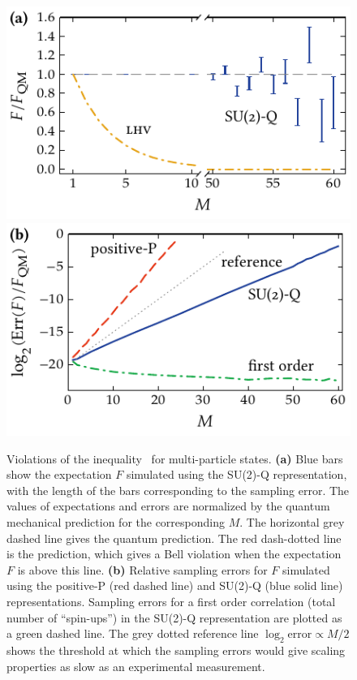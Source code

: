 \begin{figure}
    \centerline{%
    \includegraphics{figures_generated/bell/ghz_violations.pdf}%
    \includegraphics{figures_generated/bell/ghz_errors.pdf}}

    \caption[Violation of Bell inequality in  states]{
    Violations of the inequality~ for multi-particle  states.
    \textbf{(a)} Blue bars show the expectation $F$ simulated using the SU(2)-Q representation, with the length of the bars corresponding to the sampling error.
    The values of expectations and errors are normalized by the quantum mechanical prediction for the corresponding $M$.
    The horizontal grey dashed line gives the quantum prediction.
    The red dash-dotted line is the  prediction, which gives a Bell violation when the expectation $F$ is above this line.
    \textbf{(b)} Relative sampling errors for $F$ simulated using the positive-P (red dashed line) and SU(2)-Q (blue solid line) representations.
    Sampling errors for a first order correlation (total number of ``spin-ups'') in the SU(2)-Q representation are plotted as a green dashed line.
    The grey dotted reference line $\log_2 \mathrm{error} \propto M / 2$ shows the threshold at which the sampling errors would give scaling properties as slow as an experimental measurement.}%

    \label{fig:bell-ineq:ghz:violation}
\end{figure}

